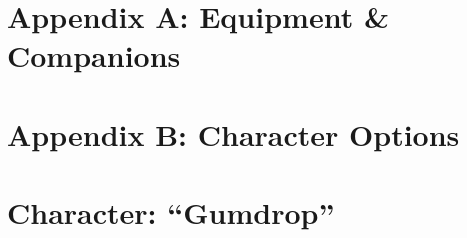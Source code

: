 \documentclass[11pt,twoside,twocolumn,openany]{book}
\begin{document}
\chapter{Appendix A: Equipment \& Companions}



\chapter{Appendix B: Character Options}



\chapter{Character: “Gumdrop”}


\clearpage

\onecolumn
\renewcommand{\bibname}{References}
{}


\end{document}
